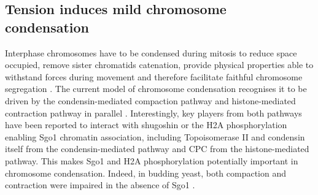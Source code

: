 \subsection{Tension induces mild chromosome condensation}

Interphase chromosomes have to be condensed during mitosis to reduce space occupied, remove sister chromatids catenation, provide physical properties able to withstand forces during movement and therefore facilitate faithful chromosome segregation \citep{Antonin2016ChromosomeMitosis, Piskadlo2016NovelCondensation, Beseda2020MitoticVariability, Takahashi2019FoldingChromosomes}. The current model of chromosome condensation recognises it to be driven by the condensin-mediated compaction pathway and histone-mediated contraction pathway in parallel \citep{Wilkins2014, Kruitwagen2015}. Interestingly, key players from both pathways have been reported to interact with shugoshin or the H2A phosphorylation enabling Sgo1 chromatin association, including Topoisomerase II \citep{Zhang2020FunctioningMitosis} and condensin itself \citep{Verzijlbergen2014, Yahya2020} from the condensin-mediated pathway and CPC \citep{Abad2022MechanisticCPC} from the histone-mediated pathway. This makes Sgo1 and H2A phosphorylation potentially important in chromosome condensation. Indeed, in budding yeast, both compaction and contraction were impaired in the absence of Sgo1 \citep{Kruitwagen2018}. 

